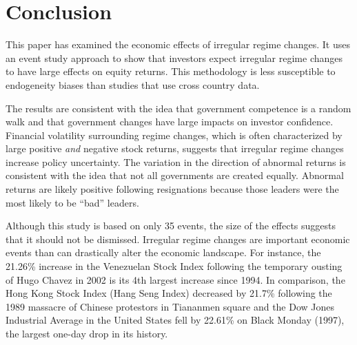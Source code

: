 \documentclass[12pt,final,fleqn]{article}
\theoremstyle{plain}
\begin{document}
\section{Conclusion}
This paper has examined the economic effects of irregular regime changes. It uses an event study approach to show that investors expect irregular regime changes to have large effects on equity returns. This methodology is less susceptible to endogeneity biases than studies that use cross country data.

The results are consistent with the idea that government competence is a random walk and that government changes have large impacts on investor confidence. Financial volatility surrounding regime changes, which is often characterized by large positive \textit{and} negative stock returns, suggests that irregular regime changes increase policy uncertainty. The variation in the direction of abnormal returns is consistent with the idea that not all governments are created equally. Abnormal returns are likely positive following resignations because those leaders were the most likely to be ``bad'' leaders.

Although this study is based on only 35 events, the size of the effects suggests that it should not be dismissed. Irregular regime changes are important economic events than can drastically alter the economic landscape. For instance, the 21.26\% increase in the Venezuelan Stock Index following the temporary ousting of Hugo Chavez in 2002 is its 4th largest increase since 1994. In comparison, the Hong Kong Stock Index (Hang Seng Index) decreased by 21.7\% following the 1989 massacre of Chinese protestors in Tiananmen square and the Dow Jones Industrial Average in the United States fell by 22.61\% on Black Monday (1997), the largest one-day drop in its history.

\appendix
\setcounter{table}{0}
\renewcommand\thetable{\Alph{section}.\arabic{table}}
\end{document}
